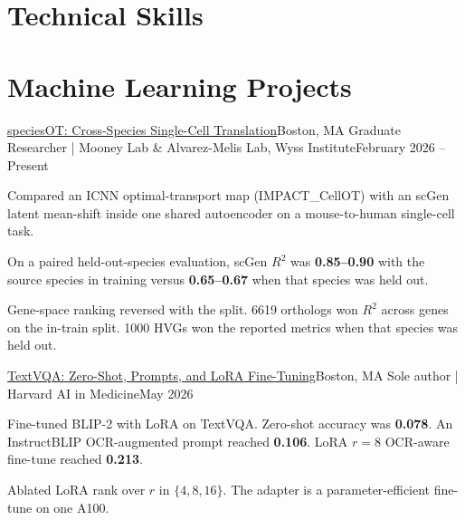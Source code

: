 \section{Technical Skills}
\resumeSubHeadingListStart
\resumeSubHeadingListEnd

\section{Machine Learning Projects}
\resumeSubHeadingListStart

  \resumeSubheading
    {\href{https://github.com/JunyiZhou-Conny/speciesOT}{speciesOT: Cross-Species Single-Cell Translation}}{Boston, MA}
    {Graduate Researcher | Mooney Lab \& Alvarez-Melis Lab, Wyss Institute}{February 2026 -- Present}
    \resumeItemListStart
      \item Compared an ICNN optimal-transport map (IMPACT\_CellOT) with an scGen latent mean-shift inside one shared autoencoder on a mouse-to-human single-cell task.
      \item On a paired held-out-species evaluation, scGen $R^2$ was \textbf{0.85--0.90} with the source species in training versus \textbf{0.65--0.67} when that species was held out.
      \item Gene-space ranking reversed with the split. 6619 orthologs won $R^2$ across genes on the in-train split. 1000 HVGs won the reported metrics when that species was held out.
    \resumeItemListEnd

  \resumeSubheading
    {\href{https://github.com/JunyiZhou-Conny/mini3}{TextVQA: Zero-Shot, Prompts, and LoRA Fine-Tuning}}{Boston, MA}
    {Sole author | Harvard AI in Medicine}{May 2026}
    \resumeItemListStart
      \item Fine-tuned BLIP-2 with LoRA on TextVQA. Zero-shot accuracy was \textbf{0.078}. An InstructBLIP OCR-augmented prompt reached \textbf{0.106}. LoRA $r{=}8$ OCR-aware fine-tune reached \textbf{0.213}.
      \item Ablated LoRA rank over $r$ in $\{4, 8, 16\}$. The adapter is a parameter-efficient fine-tune on one A100.
    \resumeItemListEnd

